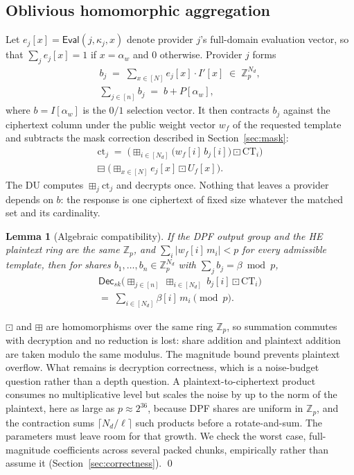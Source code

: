 \documentclass[a4paper,fleqn]{cas-dc}
\newtheorem{lemma}{Lemma}
\newcommand{\Eval}{\mathsf{Eval}}
\newcommand{\Dec}{\mathsf{Dec}}
\newcommand{\bplus}{\boxplus}
\newcommand{\bminus}{\boxminus}
\newcommand{\bdot}{\boxdot}
\begin{document}
\subsection{Oblivious homomorphic aggregation}
\label{sec:oha}
Let $e_j[x]=\Eval(j,\kappa_j,x)$ denote provider $j$'s full-domain evaluation
vector, so that $\sum_j e_j[x]=1$ if $x=\alpha_w$ and $0$ otherwise. Provider
$j$ forms
\begin{gather*}
b_j \;=\; \sum_{x\in[N]} e_j[x]\cdot I'[x] \;\in\;\mathbb{Z}_p^{N_d},\\
\sum_{j\in[n]} b_j \;=\; b + P[\alpha_w],
\end{gather*}
where $b=I[\alpha_w]$ is the $0/1$ selection vector. It then contracts $b_j$
against the ciphertext column under the public weight vector $w_f$ of the
requested template and subtracts the mask correction described in
Section~\ref{sec:mask}:
\begin{multline*}
\text{ct}_j \;=\; \Big(\bplus_{i\in[N_d]} \big(w_f[i]\,b_j[i]\big)\bdot
\text{CT}_i\Big)\\
\bminus\; \Big(\bplus_{x\in[N]} e_j[x]\bdot U_f[x]\Big).
\end{multline*}
The DU computes $\bplus_j \text{ct}_j$ and decrypts once. Nothing that leaves
a provider depends on $b$: the response is one ciphertext of fixed size
whatever the matched set and its cardinality.

\begin{lemma}[Algebraic compatibility]
\label{lem:compat}
If the DPF output group and the HE plaintext ring are the same $\mathbb{Z}_p$,
and $\sum_{i}|w_f[i]\,m_i| < p$ for every admissible template, then for shares
$b_1,\dots,b_n\in\mathbb{Z}_p^{N_d}$ with $\sum_j b_j = \beta \bmod p$,
\begin{multline*}
\Dec_{sk}\Big(\bplus_{j\in[n]}\ \bplus_{i\in[N_d]}\ b_j[i]\bdot
\text{CT}_i\Big)\\
=\; \sum_{i\in[N_d]} \beta[i]\,m_i \pmod p .
\end{multline*}
\end{lemma}
\begin{pf}
$\bdot$ and $\bplus$ are homomorphisms over the same ring $\mathbb{Z}_p$, so
summation commutes with decryption and no reduction is lost: share addition
and plaintext addition are taken modulo the same modulus. The magnitude bound
prevents plaintext overflow. What remains is decryption correctness, which is
a noise-budget question rather than a depth question. A
plaintext-to-ciphertext product consumes no multiplicative level but scales
the noise by up to the norm of the plaintext, here as large as
$p\approx2^{36}$, because DPF shares are uniform in $\mathbb{Z}_p$, and the
contraction sums $\lceil N_d/\ell\rceil$ such products before a
rotate-and-sum. The parameters must leave room for that growth. We check the
worst case, full-magnitude coefficients across several packed chunks,
empirically rather than assume it (Section~\ref{sec:correctness}). \qed
\end{pf}
\end{document}
